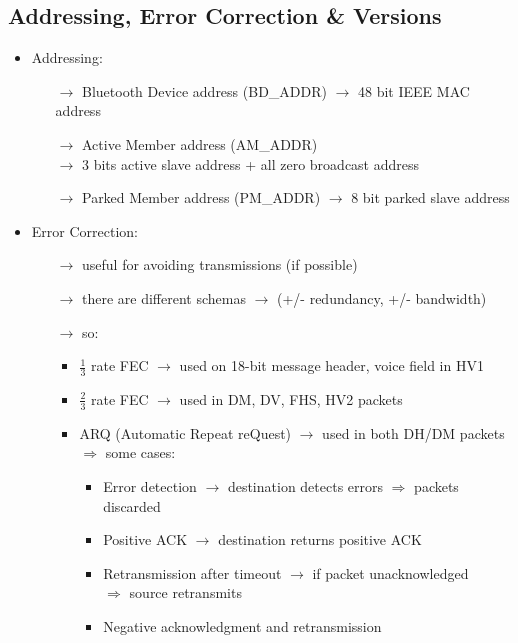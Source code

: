 \subsection{Addressing, Error Correction \& Versions}
\begin{itemize}
    \item Addressing:
    \begin{itemize}
        \item[$\rightarrow$] Bluetooth Device address (BD\_ADDR) $\rightarrow$ 48 bit IEEE MAC address
        \item[$\rightarrow$] Active Member address (AM\_ADDR)\\$\rightarrow$ 3 bits active slave address + all zero broadcast address
        \item[$\rightarrow$] Parked Member address (PM\_ADDR) $\rightarrow$ 8 bit parked slave address
    \end{itemize}
    \item Error Correction:
    \begin{itemize}
        \item[$\rightarrow$] useful for avoiding transmissions (if possible)
        \item[$\rightarrow$] there are different schemas $\rightarrow$ (+/- redundancy, +/- bandwidth)
        \item[$\rightarrow$] so:
        \begin{itemize}
            \item $\frac{1}{3}$ rate FEC\footFEC
            $\rightarrow$ used on 18-bit message header, voice field in HV1
            \item $\frac{2}{3}$ rate FEC $\rightarrow$ used in DM, DV, FHS, HV2 packets
            \item ARQ (Automatic Repeat reQuest) $\rightarrow$ used in both DH/DM packets\\
            $\Rightarrow$ some cases:
            \begin{itemize}
                \item Error detection $\rightarrow$ destination detects errors $\Rightarrow$ packets discarded
                \item Positive ACK $\rightarrow$ destination returns positive ACK
                \item Retransmission after timeout $\rightarrow$ if packet unacknowledged\\
                $\Rightarrow$ source retransmits
                \item Negative acknowledgment and retransmission\\

\end{itemize}
\end{itemize}
\end{itemize}
\end{itemize}
